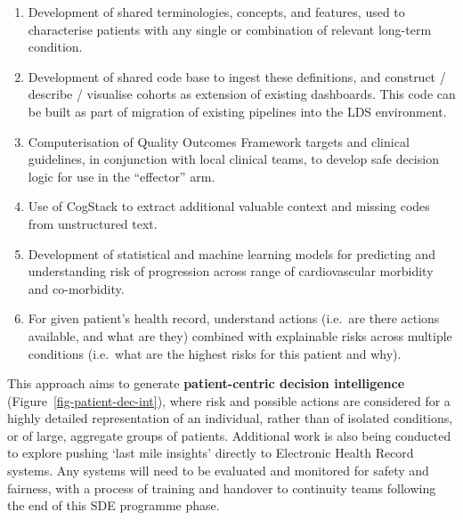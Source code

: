 \documentclass[
  letterpaper,
  DIV=11,
  numbers=noendperiod]{scrartcl}
\begin{document}
\begin{enumerate}
\def\labelenumi{(\arabic{enumi})}
\item
  Development of shared terminologies, concepts, and features, used to
  characterise patients with any single or combination of relevant
  long-term condition.
\item
  Development of shared code base to ingest these definitions, and
  construct / describe / visualise cohorts as extension of existing
  dashboards. This code can be built as part of migration of existing
  pipelines into the LDS environment.
\item
  Computerisation of Quality Outcomes Framework targets and clinical
  guidelines, in conjunction with local clinical teams, to develop safe
  decision logic for use in the ``effector'' arm.
\item
  Use of CogStack to extract additional valuable context and missing
  codes from unstructured text.
\item
  Development of statistical and machine learning models for predicting
  and understanding risk of progression across range of cardiovascular
  morbidity and co-morbidity.
\item
  For given patient's health record, understand actions (i.e.~are there
  actions available, and what are they) combined with explainable risks
  across multiple conditions (i.e.~what are the highest risks for this
  patient and why).
\end{enumerate}

This approach aims to generate \textbf{patient-centric decision
intelligence} (Figure~\ref{fig-patient-dec-int}), where risk and
possible actions are considered for a highly detailed representation of
an individual, rather than of isolated conditions, or of large,
aggregate groups of patients. Additional work is also being conducted to
explore pushing `last mile insights' directly to Electronic Health
Record systems. Any systems will need to be evaluated and monitored for
safety and fairness, with a process of training and handover to
continuity teams following the end of this SDE programme phase.
\end{document}
